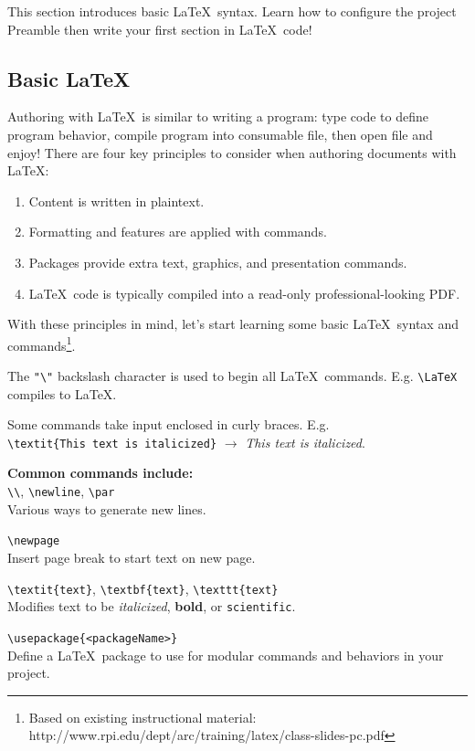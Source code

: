 This section introduces basic \LaTeX\ syntax. Learn how to configure the project Preamble then write your first section in \LaTeX\ code!
\subsection{Basic LaTeX}
Authoring with \LaTeX\ is similar to writing a program: type code to define program behavior, compile program into consumable file, then open file and enjoy! There are four key principles to consider when authoring documents with \LaTeX:
\begin{enumerate}
    \item Content is written in plaintext.
    \item Formatting and features are applied with commands.
    \item Packages provide extra text, graphics, and presentation commands.
    \item \LaTeX\ code is typically compiled into a read-only professional-looking PDF.
\end{enumerate}
With these principles in mind, let's start learning some basic \LaTeX\ syntax and commands\footnote{Based on existing instructional material: http://www.rpi.edu/dept/arc/training/latex/class-slides-pc.pdf}.
\par
The \verb|"\"| backslash character is used to begin all \LaTeX\ commands. E.g.
\verb|\LaTeX| compiles to \LaTeX.
\par
Some commands take input enclosed in curly braces. E.g.\\
\verb|\textit{This text is italicized}| $\rightarrow$ \textit{This text is italicized}.
\par
{\large\textbf{Common commands include:}}\\
\verb|\\|, \verb|\newline|, \verb|\par|\\
Various ways to generate new lines.
\par
\verb|\newpage|\\
Insert page break to start text on new page.
\par
\verb|\textit{text}|, \verb|\textbf{text}|, \verb|\texttt{text}|\\
Modifies text to be \textit{italicized}, \textbf{bold}, or \texttt{scientific}.
\par
\verb|\usepackage{<packageName>}|\\
Define a \LaTeX\ package to use for modular commands and behaviors in your project.
